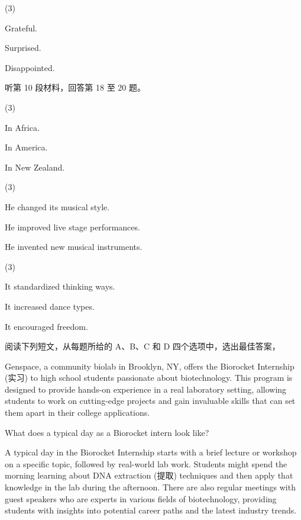 \documentclass{英语试卷}
\begin{document}
\begin{choices}(3)
  \item Grateful.
  \item Surprised.
  \item Disappointed.
\end{choices}
\par 听第 10 段材料，回答第 18 至 20 题。\par
{}
\begin{choices}(3)
  \item In Africa.
  \item In America.
  \item In New Zealand.
\end{choices}
\begin{choices}(3)
  \item He changed its musical style.
  \item He improved live stage performances.
  \item He invented new musical instruments.
\end{choices}
\begin{choices}(3)
  \item It standardized thinking ways.
  \item It increased dance types.
  \item It encouraged freedom.
\end{choices}
\par 阅读下列短文，从每题所给的 A、B、C 和 D 四个选项中，选出最佳答案，\par
{}
\par Genspace, a community biolab in Brooklyn, NY, offers the Biorocket Internship (实习) to high school students passionate about biotechnology. This program is designed to provide hands-on experience in a real laboratory setting, allowing students to work on cutting-edge projects and gain invaluable skills that can set them apart in their college applications.\par
\par What does a typical day as a Biorocket intern look like?\par
\par A typical day in the Biorocket Internship starts with a brief lecture or workshop on a specific topic, followed by real-world lab work. Students might spend the morning learning about DNA extraction (提取) techniques and then apply that knowledge in the lab during the afternoon. There are also regular meetings with guest speakers who are experts in various fields of biotechnology, providing students with insights into potential career paths and the latest industry trends.\par
\end{document}
